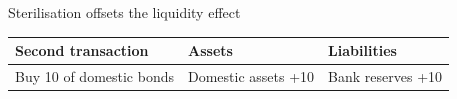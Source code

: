 \documentclass[12pt,aspectratio=169]{beamer}
\begin{document}

\begin{frame}{Sterilisation offsets the liquidity effect}
\begin{center}\begin{tabular}{@{}lll@{}}\toprule \textbf{Second transaction} & \textbf{Assets} & \textbf{Liabilities}\\\midrule Buy 10 of domestic bonds & Domestic assets +10 & Bank reserves +10\\\bottomrule\end{tabular}\end{center}
\end{frame}

\end{document}
